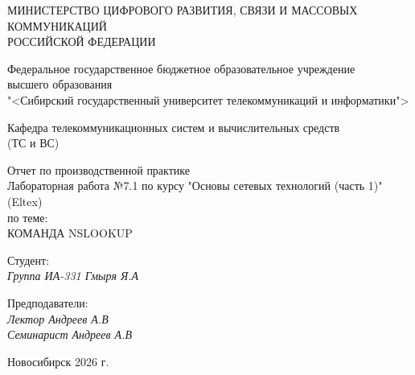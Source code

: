 \thispagestyle{empty}

\begin{center}
    МИНИСТЕРСТВО ЦИФРОВОГО РАЗВИТИЯ, СВЯЗИ И МАССОВЫХ КОММУНИКАЦИЙ \\ РОССИЙСКОЙ ФЕДЕРАЦИИ

    \vspace{20pt}

    Федеральное государственное бюджетное образовательное учреждение  \\  высшего образования \\
    "<Сибирский государственный университет телекоммуникаций и информатики"> \\

    \vspace{20pt}

    Кафедра телекоммуникационных систем и вычислительных средств \\  (ТС и ВС)
\end{center}

\vfill

\begin{center}
    Отчет по производственной практике \\  
    Лабораторная работа №7.1 по курсу "Основы сетевых технологий (часть 1)" (Eltex) \\
    \vspace{20pt}
    по теме: \\
    \uppercase{Команда nslookup}
\end{center}

\vfill

    \noindent Студент: \\
    \textit{Группа ИА-331 \hfill Гмыря Я.А} 

    \vspace{20pt}
 
    \noindent Предподаватели: \\
    \textit{Лектор \hfill Андреев А.В} \\
    \textit{Семинарист \hfill Андреев А.В}

\vfill

\begin{center}
    Новосибирск 2026 г.
\end{center}